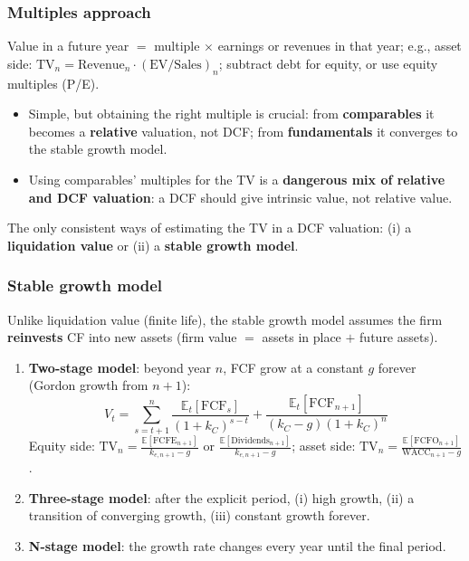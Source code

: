 \subsubsection*{Multiples approach}
Value in a future year $=$ multiple $\times$ earnings or revenues in that year; e.g., asset side: $\text{TV}_n=\text{Revenue}_n\cdot(\text{EV}/\text{Sales})_n$; subtract debt for equity, or use equity multiples (P/E).
\begin{itemize}
  \item Simple, but obtaining the right multiple is crucial: from \textbf{comparables} it becomes a \textbf{relative} valuation, not DCF; from \textbf{fundamentals} it converges to the stable growth model.
  \item Using comparables' multiples for the TV is a \textbf{dangerous mix of relative and DCF valuation}: a DCF should give intrinsic value, not relative value.
\end{itemize}
\begin{keybox}
The only consistent ways of estimating the TV in a DCF valuation: (i) a \textbf{liquidation value} or (ii) a \textbf{stable growth model}.
\end{keybox}

\subsubsection*{Stable growth model}
Unlike liquidation value (finite life), the stable growth model assumes the firm \textbf{reinvests} CF into new assets (firm value $=$ assets in place $+$ future assets).
\begin{enumerate}
  \item \textbf{Two-stage model}: beyond year $n$, FCF grow at a constant $g$ forever (Gordon growth from $n+1$):
  \[
  V_t=\sum_{s=t+1}^{n}\frac{\mathbb{E}_t[\text{FCF}_s]}{(1+k_C)^{s-t}}+\frac{\mathbb{E}_t[\text{FCF}_{n+1}]}{(k_C-g)(1+k_C)^n}
  \]
  Equity side: $\text{TV}_n=\frac{\mathbb{E}[\text{FCFE}_{n+1}]}{k_{e,n+1}-g}$ or $\frac{\mathbb{E}[\text{Dividends}_{n+1}]}{k_{e,n+1}-g}$; asset side: $\text{TV}_n=\frac{\mathbb{E}[\text{FCFO}_{n+1}]}{\text{WACC}_{n+1}-g}$.
  \item \textbf{Three-stage model}: after the explicit period, (i) high growth, (ii) a transition of converging growth, (iii) constant growth forever.
  \item \textbf{N-stage model}: the growth rate changes every year until the final period.
\end{enumerate}

